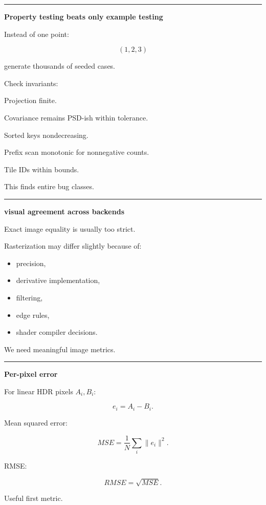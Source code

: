 \begin{center}\rule{0.5\linewidth}{0.5pt}\end{center}

\textbf{Property testing beats only example testing}

Instead of one point:

\[
(1,2,3)
\]

generate thousands of seeded cases.

Check invariants:

Projection finite.

Covariance remains PSD-ish within tolerance.

Sorted keys nondecreasing.

Prefix scan monotonic for nonnegative counts.

Tile IDs within bounds.

This finds entire bug classes.

\begin{center}\rule{0.5\linewidth}{0.5pt}\end{center}

\textbf{visual agreement across backends}

Exact image equality is usually too strict.

Rasterization may differ slightly because of:

\begin{itemize}
\tightlist
\item
  precision,
\item
  derivative implementation,
\item
  filtering,
\item
  edge rules,
\item
  shader compiler decisions.
\end{itemize}

We need meaningful image metrics.

\begin{center}\rule{0.5\linewidth}{0.5pt}\end{center}

\textbf{Per-pixel error}

For linear HDR pixels \(A_i,B_i\):

\[
e_i=A_i-B_i.
\]

Mean squared error:

\[
MSE=
\frac1N
\sum_i
\|e_i\|^2.
\]

RMSE:

\[
\boxed{
RMSE=
\sqrt{MSE}.
}
\]

Useful first metric.

